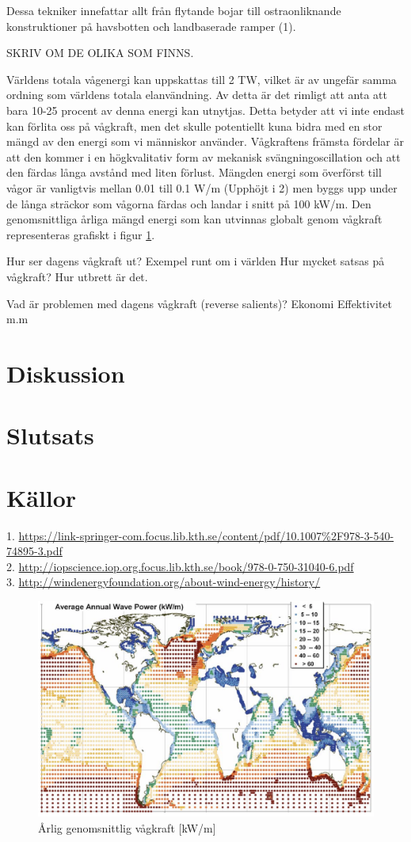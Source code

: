 \documentclass[10pt,a4paper,oneside]{article}
\begin{document}
 Dessa tekniker innefattar allt från flytande bojar till ostraonliknande konstruktioner på havsbotten och landbaserade ramper (1).

SKRIV OM DE OLIKA SOM FINNS. 

Världens totala vågenergi kan uppskattas till 2 TW, vilket är av ungefär samma ordning som världens totala elanvändning. Av detta är det rimligt att anta att bara 10-25 procent av denna energi kan utnytjas. Detta betyder att vi inte endast kan förlita oss på vågkraft, men det skulle potentiellt kuna bidra med en stor mängd av den energi som vi människor använder. Vågkraftens främsta fördelar är att den kommer i en högkvalitativ form av mekanisk svängningoscillation och att den färdas långa avstånd med liten förlust. Mängden energi som överförst till vågor är vanligtvis mellan 0.01 till 0.1 W/m (Upphöjt i 2) men byggs upp under de långa sträckor som vågorna färdas och landar i snitt på 100 kW/m. Den genomsnittliga årliga mängd energi som kan utvinnas globalt genom vågkraft representeras grafiskt i figur \ref{Globalmean}. 
 
\newpage 


Hur ser dagens vågkraft ut?
Exempel runt om i världen
Hur mycket satsas på vågkraft?
Hur utbrett är det.

Vad är problemen med dagens vågkraft (reverse salients)?
Ekonomi
Effektivitet 
m.m 

\section{Diskussion}

\section{Slutsats}

\section{Källor}
1. \url{https://link-springer-com.focus.lib.kth.se/content/pdf/10.1007%2F978-3-540-74895-3.pdf} \\
2. \url{http://iopscience.iop.org.focus.lib.kth.se/book/978-0-750-31040-6.pdf} \\
3. \url{http://windenergyfoundation.org/about-wind-energy/history/} \\




\begin{figure}
\label{Globalmean}
	\includegraphics[scale=0.6]{globalmean.png}
	\caption{\r{A}rlig genomsnittlig v\r{a}gkraft [kW/m]}
\end{figure}
\end{document}

